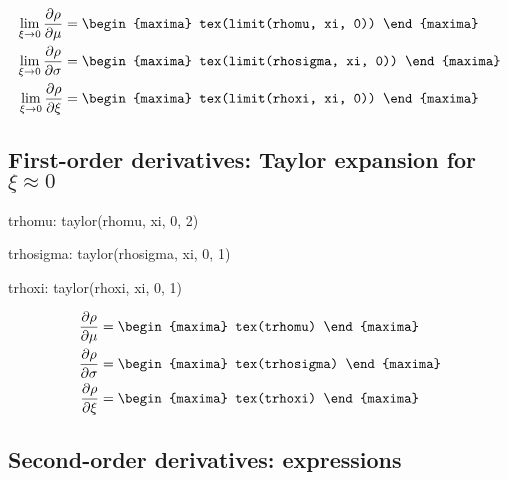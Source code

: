 {\color{MonVertF}
\begin{align*}
\lim_{\xi \to 0} \frac{\partial \rho}{\partial \mu} &= 
\begin{maxima}
 tex(limit(rhomu, xi, 0))
\end{maxima}
\\
\lim_{\xi \to 0} \frac{\partial \rho}{\partial \sigma} &= 
\begin{maxima}
 tex(limit(rhosigma, xi, 0))
\end{maxima}
\\
\lim_{\xi \to 0} \frac{\partial \rho}{\partial \xi} &= 
\begin{maxima}
 tex(limit(rhoxi, xi, 0))
\end{maxima}
\end{align*}
}

\subsection{First-order derivatives: Taylor expansion for $\xi \approx 0$}
{\color{MonVertF}
\begin{maxima}
  trhomu: taylor(rhomu, xi, 0, 2)
\end{maxima}
\begin{maxima}
  trhosigma: taylor(rhosigma, xi, 0, 1)
\end{maxima}
\begin{maxima}
  trhoxi: taylor(rhoxi, xi, 0, 1)
\end{maxima}
}

{\color{MonVertF}
\begin{align*}
  \frac{\partial \rho}{\partial \mu}
  &=
  \begin{maxima}
    tex(trhomu)
  \end{maxima} \\
  \frac{\partial \rho}{\partial \sigma}
  &=
  \begin{maxima}
    tex(trhosigma)
  \end{maxima} \\
  \frac{\partial \rho}{\partial \xi}
  &=
  \begin{maxima}
    tex(trhoxi)
  \end{maxima}
\end{align*}
}

\subsection{Second-order derivatives: expressions}

